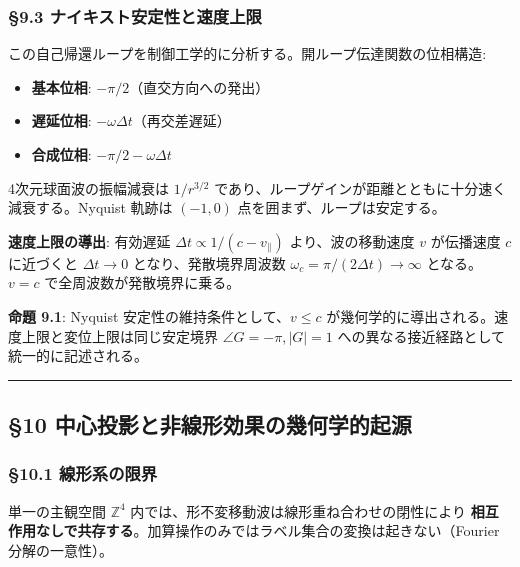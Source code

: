 \documentclass[
  a4paper,11pt]{ltjsarticle}
\providecommand{\tightlist}{%
  \setlength{\itemsep}{0pt}\setlength{\parskip}{0pt}}
\theoremstyle{definition}
\theoremstyle{remark}
\begin{document}
\subsubsection{§9.3
ナイキスト安定性と速度上限}\label{ux30caux30a4ux30adux30b9ux30c8ux5b89ux5b9aux6027ux3068ux901fux5ea6ux4e0aux9650}

この自己帰還ループを制御工学的に分析する。開ループ伝達関数の位相構造:

\begin{itemize}
\tightlist
\item
  \textbf{基本位相}: \(-\pi/2\)（直交方向への発出）
\item
  \textbf{遅延位相}: \(-\omega \Delta t\)（再交差遅延）
\item
  \textbf{合成位相}: \(-\pi/2 - \omega \Delta t\)
\end{itemize}

4次元球面波の振幅減衰は \(1/r^{3/2}\)
であり、ループゲインが距離とともに十分速く減衰する。Nyquist 軌跡は
\((-1, 0)\) 点を囲まず、ループは安定する。

\textbf{速度上限の導出}: 有効遅延
\(\Delta t \propto 1/(c - v_\parallel)\) より、波の移動速度 \(v\)
が伝播速度 \(c\) に近づくと \(\Delta t \to 0\) となり、発散境界周波数
\(\omega_c = \pi/(2\Delta t) \to \infty\) となる。\(v = c\)
で全周波数が発散境界に乗る。

\textbf{命題 9.1}: Nyquist 安定性の維持条件として、\(v \leq c\)
が幾何学的に導出される。速度上限と変位上限は同じ安定境界
\(\angle G = -\pi, |G| = 1\)
への異なる接近経路として統一的に記述される。

\begin{center}\rule{0.5\linewidth}{0.5pt}\end{center}

\subsection{§10
中心投影と非線形効果の幾何学的起源}\label{ux4e2dux5fc3ux6295ux5f71ux3068ux975eux7ddaux5f62ux52b9ux679cux306eux5e7eux4f55ux5b66ux7684ux8d77ux6e90}

\subsubsection{§10.1
線形系の限界}\label{ux7ddaux5f62ux7cfbux306eux9650ux754c}

単一の主観空間 \(\mathbb{Z}^4\)
内では、形不変移動波は線形重ね合わせの閉性により
\textbf{相互作用なしで共存する}。加算操作のみではラベル集合の変換は起きない（Fourier
分解の一意性）。
\end{document}
